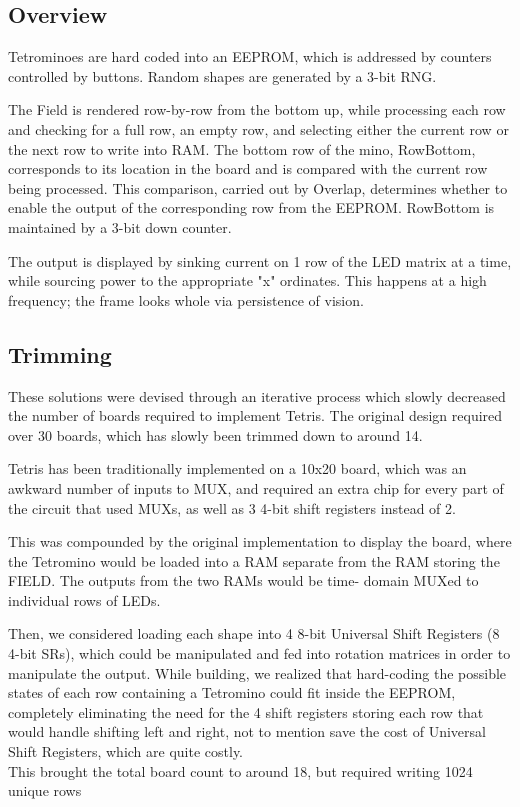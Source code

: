 \documentclass[letterpaper,titlepage,oneside]{article}
\begin{document}
\subsection{Overview}
Tetrominoes are hard coded into an EEPROM, which is addressed by counters controlled by buttons. Random shapes are generated by a 3-bit RNG.

The Field is rendered row-by-row from the bottom up, while processing each row and checking for a full row, an empty row, and selecting either the current row or the next row to write into RAM. The bottom row of the mino, RowBottom, corresponds to its location in the board and is compared with the current row being processed. This comparison, carried out by Overlap, determines whether to enable the output of the corresponding row from the EEPROM. RowBottom is maintained by a 3-bit down counter.

The output is displayed by sinking current on 1 row of the LED matrix at a time, while sourcing power to the appropriate "x" ordinates. This happens at a high frequency; the frame looks whole via persistence of vision.

\subsection{Trimming}
These solutions were devised through an iterative process which slowly decreased the number of boards required to implement Tetris. The original design required over 30 boards, which has slowly been trimmed down to around 14.

Tetris has been traditionally implemented on a 10x20 board, which was an awkward number of inputs to MUX, and required an extra chip for every part of the circuit that used MUXs, as well as 3 4-bit shift registers instead of 2. 

This was compounded by the original implementation to display the board, where the Tetromino would be loaded into a RAM separate from the RAM storing the FIELD. The outputs from the two RAMs would be time-	domain MUXed to individual rows of LEDs. 

Then, we considered loading each shape into 4 8-bit Universal Shift Registers (8 4-bit SRs), which could be manipulated and fed into rotation matrices in order to manipulate the output. While building, we realized that hard-coding the possible states of each row containing a Tetromino could fit inside the EEPROM, completely eliminating the need for the 4 shift registers storing each row that would handle shifting left and right, not to mention save the cost of Universal Shift Registers, which are quite costly. \\
This brought the total board count to around 18, but required writing 1024 unique rows
\end{document}
